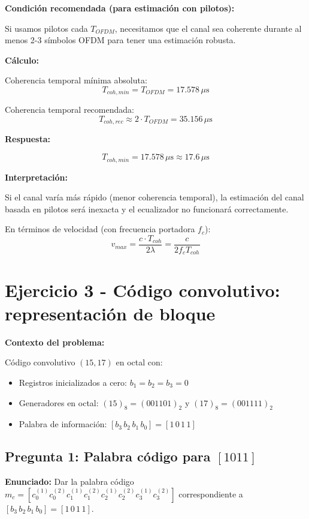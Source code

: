 \documentclass[11pt,a4paper]{article}
\begin{document}
\textbf{Condici\'on recomendada (para estimaci\'on con pilotos):}

Si usamos pilotos cada $T_{OFDM}$, necesitamos que el canal sea coherente durante al menos 2-3 s\'imbolos OFDM para tener una estimaci\'on robusta.

\textbf{C\'alculo:}

Coherencia temporal m\'inima absoluta:
\[
T_{coh,min} = T_{OFDM} = 17.578 \, \mu\text{s}
\]

Coherencia temporal recomendada:
\[
T_{coh,rec} \approx 2 \cdot T_{OFDM} = 35.156 \, \mu\text{s}
\]

\textbf{Respuesta:}

\[
\boxed{T_{coh,min} = 17.578 \, \mu\text{s} \approx 17.6 \, \mu\text{s}}
\]

\textbf{Interpretaci\'on:}

Si el canal var\'ia m\'as r\'apido (menor coherencia temporal), la estimaci\'on del canal basada en pilotos ser\'a inexacta y el ecualizador no funcionar\'a correctamente.

En t\'erminos de velocidad (con frecuencia portadora $f_c$):
\[
v_{max} = \frac{c \cdot T_{coh}}{2 \lambda} = \frac{c}{2 f_c T_{coh}}
\]

\section*{Ejercicio 3 - C\'odigo convolutivo: representaci\'on de bloque}

\textbf{Contexto del problema:}

C\'odigo convolutivo $(15, 17)$ en octal con:
\begin{itemize}
    \item Registros inicializados a cero: $b_1 = b_2 = b_3 = 0$
    \item Generadores en octal: $(15)_8 = (001101)_2$ y $(17)_8 = (001111)_2$
    \item Palabra de informaci\'on: $[b_3 \, b_2 \, b_1 \, b_0] = [1 \, 0 \, 1 \, 1]$
\end{itemize}

\subsection*{Pregunta 1: Palabra c\'odigo para $[1011]$}

\textbf{Enunciado:} Dar la palabra c\'odigo $m_c = [c_0^{(1)} c_0^{(2)} c_1^{(1)} c_1^{(2)} c_2^{(1)} c_2^{(2)} c_3^{(1)} c_3^{(2)}]$ correspondiente a $[b_3 \, b_2 \, b_1 \, b_0] = [1 \, 0 \, 1 \, 1]$.
\end{document}
